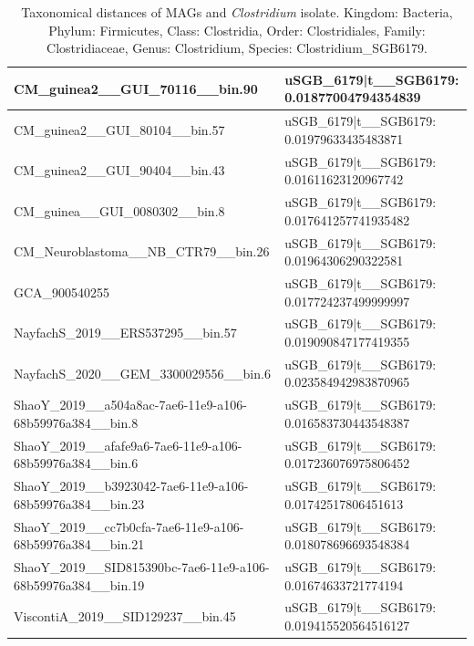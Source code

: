 \documentclass[11pt]{article}
\begin{document}
\begin{landscape}
\begin{table}[!ht]
\begin{tabular}{|l|l|}
        CM\_guinea2\_\_GUI\_70116\_\_bin.90 & uSGB\_6179|t\_\_SGB6179: 0.01877004794354839 \\ \hline
        CM\_guinea2\_\_GUI\_80104\_\_bin.57 & uSGB\_6179|t\_\_SGB6179: 0.01979633435483871 \\ \hline
        CM\_guinea2\_\_GUI\_90404\_\_bin.43 & uSGB\_6179|t\_\_SGB6179: 0.01611623120967742 \\ \hline
        CM\_guinea\_\_GUI\_0080302\_\_bin.8 & uSGB\_6179|t\_\_SGB6179: 0.017641257741935482 \\ \hline
        CM\_Neuroblastoma\_\_NB\_CTR79\_\_bin.26 & uSGB\_6179|t\_\_SGB6179: 0.01964306290322581 \\ \hline
        GCA\_900540255 & uSGB\_6179|t\_\_SGB6179: 0.017724237499999997 \\ \hline
        NayfachS\_2019\_\_ERS537295\_\_bin.57 & uSGB\_6179|t\_\_SGB6179: 0.019090847177419355 \\ \hline
        NayfachS\_2020\_\_GEM\_3300029556\_\_bin.6 & uSGB\_6179|t\_\_SGB6179: 0.023584942983870965 \\ \hline
        ShaoY\_2019\_\_a504a8ac-7ae6-11e9-a106-68b59976a384\_\_bin.8 & uSGB\_6179|t\_\_SGB6179: 0.016583730443548387 \\ \hline
        ShaoY\_2019\_\_afafe9a6-7ae6-11e9-a106-68b59976a384\_\_bin.6 & uSGB\_6179|t\_\_SGB6179: 0.017236076975806452 \\ \hline
        ShaoY\_2019\_\_b3923042-7ae6-11e9-a106-68b59976a384\_\_bin.23 & uSGB\_6179|t\_\_SGB6179: 0.01742517806451613 \\ \hline
        ShaoY\_2019\_\_cc7b0cfa-7ae6-11e9-a106-68b59976a384\_\_bin.21 & uSGB\_6179|t\_\_SGB6179: 0.018078696693548384 \\ \hline
        ShaoY\_2019\_\_SID815390bc-7ae6-11e9-a106-68b59976a384\_\_bin.19 & uSGB\_6179|t\_\_SGB6179: 0.01674633721774194 \\ \hline
        ViscontiA\_2019\_\_SID129237\_\_bin.45 & uSGB\_6179|t\_\_SGB6179: 0.019415520564516127 \\ \hline
    \end{tabular}
    \caption{Taxonomical distances of MAGs and \textit{Clostridium} isolate. Kingdom: Bacteria, Phylum: Firmicutes, Class: Clostridia, Order: Clostridiales, Family: Clostridiaceae, Genus: Clostridium, Species: Clostridium\_SGB6179.}
    \label{Table:Taxonomical distance of MAGs}
\end{table}
\end{landscape}
\end{document}
